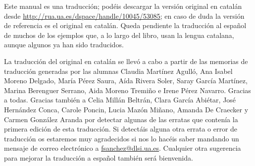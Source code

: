 Este manual es una traducción; podéis descargar la versión original en
catalán desde \url{http://rua.ua.es/dspace/handle/10045/53085}; en
caso de duda la versión de referencia es el original en catalán. Queda
pendiente la traducción al español de muchos de los ejemplos que, a lo
largo del libro, usan la lengua catalana, aunque algunos ya han sido
traducidos. 

La traducción del original en catalán se llevó a cabo a partir de las
memorias de traducción generadas por las alumnas Claudia Martínez
Agulló, Ana Isabel Moreno Delgado, María Pérez Saura, Aída Rivera
Soler, Saray García Martínez, Marina Berenguer Serrano, Aida Moreno
Tremiño e Irene Pérez Navarro. Gracias a todas. Gracias también a
Celia Millán Beltrán, Clara García Abiétar, José Hernández Conca,
Carole Poncin, Lucia Mazón Miñano, Amanda De Craecker y Carmen González
Aranda por detectar
algunas de las erratas que contenía la primera edición de esta
traducción. Si detectáis alguna otra errata o error de traducción os
estaremos muy agradecidos si nos lo hacéis saber mandando un mensaje
de correo electrónico a \url{fsanchez@dlsi.ua.es}. Cualquier otra
sugerencia para mejorar la traducción a español también será
bienvenida.



